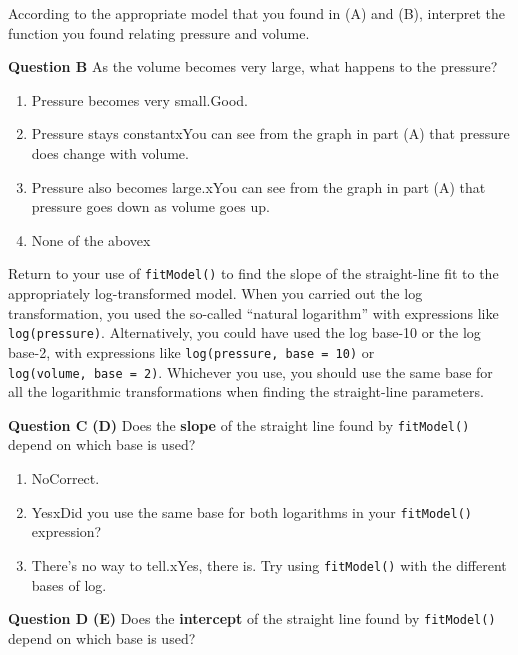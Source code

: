 \documentclass[
  letterpaper,
  DIV=11,
  numbers=noendperiod,
  oneside]{article}
\providecommand{\tightlist}{%
  \setlength{\itemsep}{0pt}\setlength{\parskip}{0pt}}\usepackage{longtable,booktabs,array}
\begin{document}
\begin{multicols}{2}
According to the appropriate model that you found in (A) and (B),
interpret the function you found relating pressure and volume.

\textbf{Question B} As the volume becomes very large, what happens to
the pressure?

\begin{enumerate}
\def\labelenumi{\roman{enumi}.}
\tightlist
\item
  {Pressure becomes very small.{Good.~}}\\
\item
  {Pressure stays constant{xYou can see from the graph in part (A)
  that pressure does change with volume.}}\\
\item
  {Pressure also becomes large.{xYou can see from the graph in part
  (A) that pressure goes down as volume goes up.}}\\
\item
  {None of the above{x}}
\end{enumerate}

Return to your use of \texttt{fitModel()} to find the slope of the
straight-line fit to the appropriately log-transformed model. When you
carried out the log transformation, you used the so-called ``natural
logarithm'' with expressions like \texttt{log(pressure)}. Alternatively,
you could have used the log base-10 or the log base-2, with expressions
like \texttt{log(pressure,\ base\ =\ 10)} or
\texttt{log(volume,\ base\ =\ 2)}. Whichever you use, you should use the
same base for all the logarithmic transformations when finding the
straight-line parameters.

\textbf{Question C} \textbf{(D)} Does the \textbf{slope} of the straight
line found by \texttt{fitModel()} depend on which base is used?

\begin{enumerate}
\def\labelenumi{\roman{enumi}.}
\tightlist
\item
  {No{Correct.~}}\\
\item
  {Yes{xDid you use the same base for both logarithms in your
  \texttt{fitModel()} expression?}}\\
\item
  {There's no way to tell.{xYes, there is. Try using
  \texttt{fitModel()} with the different bases of log.}}
\end{enumerate}

\textbf{Question D} \textbf{(E)} Does the \textbf{intercept} of the
straight line found by \texttt{fitModel()} depend on which base is used?


\end{multicols}
\end{document}
